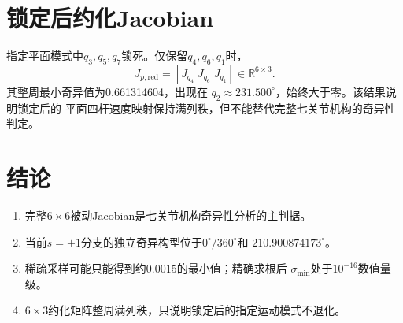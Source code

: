 \documentclass[UTF8,12pt,a4paper]{ctexart}
\begin{document}
\section{锁定后约化Jacobian}
指定平面模式中$q_3,q_5,q_7$锁死。仅保留$q_4,q_6,q_1$时，
\[
J_{p,\mathrm{red}}=
\left[J_{q_4}\;J_{q_6}\;J_{q_1}\right]
\in\mathbb R^{6\times3}.
\]
其整周最小奇异值为0.661314604，出现在
$q_2\approx231.500^\circ$，始终大于零。该结果说明锁定后的
平面四杆速度映射保持满列秩，但不能替代完整七关节机构的奇异性判定。

\section{结论}
\begin{enumerate}
\item 完整$6\times6$被动Jacobian是七关节机构奇异性分析的主判据。
\item 当前$s=+1$分支的独立奇异构型位于$0^\circ/360^\circ$和
$210.900874173^\circ$。
\item 稀疏采样可能只能得到约$0.0015$的最小值；精确求根后
$\sigma_{\min}$处于$10^{-16}$数值量级。
\item $6\times3$约化矩阵整周满列秩，只说明锁定后的指定运动模式不退化。
\end{enumerate}
\end{document}
